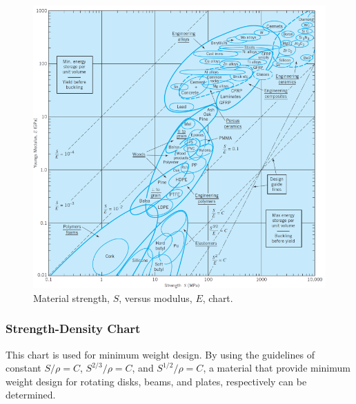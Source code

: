 \documentclass[
10pt,
a4paper,
openany,
svgnames,
]{book}
\begin{document}
\begin{figure}[h]
  \centering
  \includegraphics[scale=0.82]{pictures/Material-selection/strength-stiffness-diagram}
  \caption{Material strength, $S$, versus modulus, $E$, chart. \cite{ashby2010materials}}
  \label{fig: strength stiffness diagram}
\end{figure}

\subsubsection{Strength-Density Chart} \label{subsub: strength-density}
This chart is used for minimum weight design. By using the guidelines of constant $S/\rho = C$, $S^{2/3}/\rho = C$, and $S^{1/2}/\rho = C$, a material that provide minimum weight design for rotating disks, beams, and plates, respectively can be determined.
\end{document}
